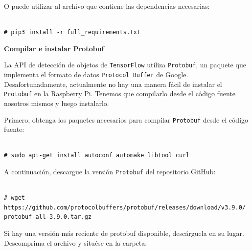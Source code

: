 O puede utilizar al archivo que contiene las dependencias necesarias:

\vspace{-1.4cm}

\begin{verbatim}

# pip3 install -r full_requirements.txt

\end{verbatim}

\vspace{-1.4cm}

\newpage

\textbf{Compilar e instalar Protobuf}

La API de detección de objetos de \texttt{TensorFlow} utiliza \texttt{Protobuf}, un paquete que implementa el formato de datos \texttt{Protocol Buffer} de Google. Desafortunadamente, actualmente no hay una manera fácil de instalar el \texttt{Protobuf} en la Raspberry Pi. Tenemos que compilarlo desde el código fuente nosotros mismos y luego instalarlo.

Primero, obtenga los paquetes necesarios para compilar \texttt{Protobuf} desde el código fuente:

\vspace{-1.4cm}

\begin{verbatim}

# sudo apt-get install autoconf automake libtool curl

\end{verbatim}

\vspace{-1.4cm}

A continuación, descargue la versión \texttt{Protobuf} del repositorio GitHub:

\vspace{-1.4cm}

\begin{verbatim}

# wget https://github.com/protocolbuffers/protobuf/releases/download/v3.9.0/
protobuf-all-3.9.0.tar.gz

\end{verbatim}

\vspace{-1.4cm}

Si hay una versión más reciente de protobuf disponible, descárguela en su lugar. Descomprima el archivo y situése en la carpeta:

\vspace{-0.5cm}

